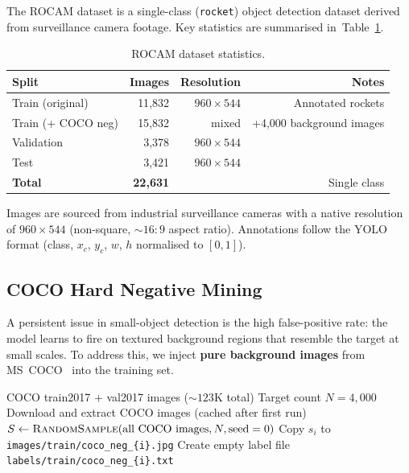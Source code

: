 \documentclass[12pt, titlepage]{article}
\begin{document}
The ROCAM dataset is a single-class (\texttt{rocket}) object detection dataset
derived from surveillance camera footage. Key statistics are summarised
in~Table~\ref{tab:dataset}.

\begin{table}[h]
  \centering
  \caption{ROCAM dataset statistics.}
  \label{tab:dataset}
  \begin{tabular}{@{}lrrr@{}}
    \toprule
    \textbf{Split}     & \textbf{Images}   & \textbf{Resolution} & \textbf{Notes}             \\
    \midrule
    Train (original)   & 11{,}832          & $960{\times}544$    & Annotated rockets          \\
    Train (+ COCO neg) & 15{,}832          & mixed               & +4{,}000 background images \\
    Validation         & 3{,}378           & $960{\times}544$    &                            \\
    Test               & 3{,}421           & $960{\times}544$    &                            \\
    \midrule
    \textbf{Total}     & \textbf{22{,}631} &                     & Single class               \\
    \bottomrule
  \end{tabular}
\end{table}

Images are sourced from industrial surveillance cameras with a native
resolution of $960{\times}544$ (non-square, $\sim\!16{:}9$ aspect ratio).
Annotations follow the YOLO format (class, $x_c$, $y_c$, $w$, $h$ normalised to
$[0,1]$).

\subsection{COCO Hard Negative Mining}
\label{sec:coco_neg}

A persistent issue in small-object detection is the high false-positive rate:
the model learns to fire on textured background regions that resemble the
target at small scales. To address this, we inject \textbf{pure background
  images} from MS~COCO~\citep{lin2014coco} into the training set.

\begin{algorithm}[h]
  \caption{COCO Hard Negative Mining Pipeline}
  \label{alg:coco}
  \begin{algorithmic}[1]
    \Require COCO train2017 + val2017 images (${\sim}123$K total)
    \Require Target count $N = 4{,}000$
    \State Download and extract COCO images (cached after first run)
    \State $S \gets \textsc{RandomSample}(\text{all COCO images}, N, \text{seed}=0)$
    \State Copy $s_i$ to \texttt{images/train/coco\_neg\_\{i\}.jpg}
    \State Create empty label file \texttt{labels/train/coco\_neg\_\{i\}.txt}
    \EndFor
  \end{algorithmic}
\end{algorithm}
\end{document}
